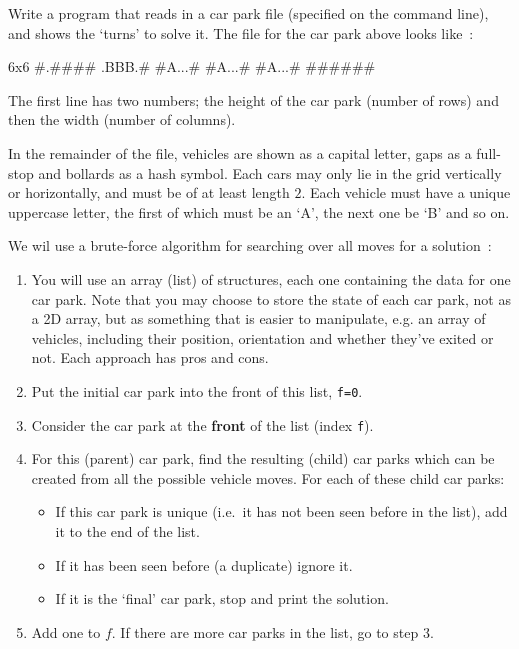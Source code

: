 \begin{exercise}
Write a program that reads in a car park file (specified on the command line), and shows the `turns' to solve it. The file for the car park above looks like~:
\begin{terminaloutput}
6x6
#.####
.BBB.#
#A...#
#A...#
#A...#
######
\end{terminaloutput}

\noindent The first line has two numbers; the height of
the car park (number of rows) and then the width (number of columns).

\noindent
In the remainder of the file, vehicles are shown as a capital letter,
gaps as a full-stop and bollards as a hash symbol. Each cars may only
lie in the grid vertically or horizontally, and must be of at least 
length $2$. Each vehicle must have a unique uppercase letter, the first of which must be an `A', the next one be `B' and so on.

\noindent
We wil use a brute-force algorithm for searching over all moves for a
solution~:
\begin{enumerate}
\item You will use an array (list) of structures, each one containing the data for one car park.
Note that you may choose to store the state of each car park, not as
a 2D array, but as something that is easier to manipulate, e.g. an array
of vehicles, including their position, orientation and whether they've exited or not.
Each approach has pros and cons.
\item Put the initial car park into the front of this list, \verb^f=0^.
\item Consider the car park at the {\bf front} of the list (index \verb$f$).
\item For this (parent) car park, find the resulting (child) car parks 
which can be created from all the possible vehicle moves. For each of these child car parks:
\begin{itemize}
\item If this car park is unique (i.e.\ it has not been seen before in the list), add it to the end of the list.
\item If it has been seen before (a duplicate) ignore it.
\item If it is the `final' car park, stop and print the solution.
\end{itemize}
\item Add one to $f$. If there are more car parks in the list, go to step $3$.
\end{enumerate}


\end{exercise}
